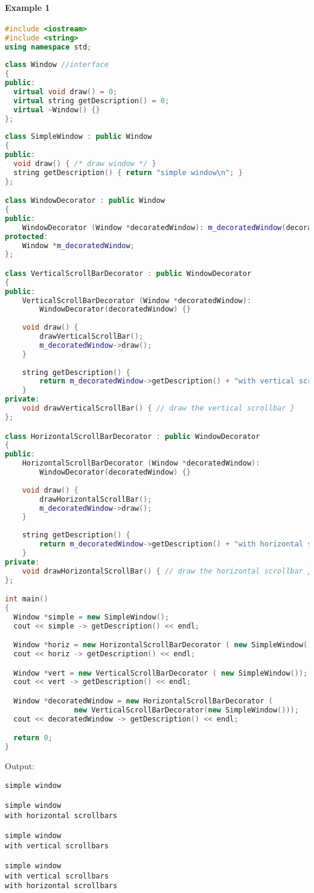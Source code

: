 \documentclass{book}
\begin{document}
\paragraph{Example 1}
\begin{lstlisting}[caption={Decorator Pattern sample 1}, language=C++]
#include <iostream> 
#include <string>
using namespace std;
 
class Window //interface
{
public:
  virtual void draw() = 0;
  virtual string getDescription() = 0;
  virtual ~Window() {}
};
 
class SimpleWindow : public Window 
{
public:
  void draw() { /* draw window */ }
  string getDescription() { return "simple window\n"; }
};

class WindowDecorator : public Window 
{
public:
	WindowDecorator (Window *decoratedWindow): m_decoratedWindow(decoratedWindow) {}
protected:
	Window *m_decoratedWindow; 
};

class VerticalScrollBarDecorator : public WindowDecorator 
{
public:
	VerticalScrollBarDecorator (Window *decoratedWindow): 
		WindowDecorator(decoratedWindow) {}
 
	void draw() {
        drawVerticalScrollBar();
        m_decoratedWindow->draw();
    }
 
    string getDescription() {
        return m_decoratedWindow->getDescription() + "with vertical scrollbars\n";
    }
private:
	void drawVerticalScrollBar() { // draw the vertical scrollbar }
};

class HorizontalScrollBarDecorator : public WindowDecorator 
{
public:
	HorizontalScrollBarDecorator (Window *decoratedWindow): 
		WindowDecorator(decoratedWindow) {}
 
	void draw() {
        drawHorizontalScrollBar();
        m_decoratedWindow->draw();
    }
 
    string getDescription() {
        return m_decoratedWindow->getDescription() + "with horizontal scrollbars\n";
	}
private:
	void drawHorizontalScrollBar() { // draw the horizontal scrollbar }
};

int main()
{
  Window *simple = new SimpleWindow();
  cout << simple -> getDescription() << endl;

  Window *horiz = new HorizontalScrollBarDecorator ( new SimpleWindow());
  cout << horiz -> getDescription() << endl;

  Window *vert = new VerticalScrollBarDecorator ( new SimpleWindow());
  cout << vert -> getDescription() << endl;

  Window *decoratedWindow = new HorizontalScrollBarDecorator (
                new VerticalScrollBarDecorator(new SimpleWindow()));
  cout << decoratedWindow -> getDescription() << endl;

  return 0;
}
\end{lstlisting}
Output:
\begin{verbatim}
simple window

simple window
with horizontal scrollbars

simple window
with vertical scrollbars

simple window
with vertical scrollbars
with horizontal scrollbars
\end{verbatim}
\end{document}
